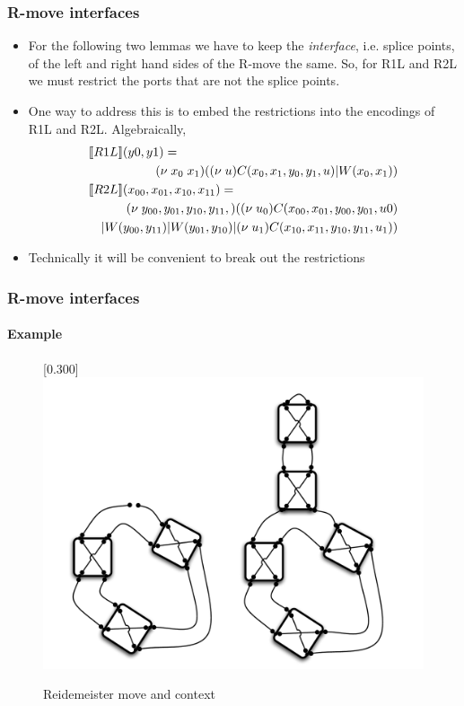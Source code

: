 \documentclass{beamer}
\begin{document}
\begin{frame}
  \frametitle{R-move interfaces}
  \begin{itemize}
  \item For the following two lemmas we have to keep the
    \textit{interface}, i.e. splice points, of the left and right hand
    sides of the R-move the same. So, for R1L and R2L we must restrict
    the ports that are not the splice points.
  \item One way to address this is to embed the restrictions into the
    encodings of R1L and R2L. Algebraically,
    \begin{eqnarray}
      \lefteqn{\meaningof{R1L}(y0,y1) =} \nonumber \\
      & & (\nu \; x_{0} \; x_{1}) ((\nu \; u)C(x_{0},x_{1},y_{0},y_{1},u) | W(x_{0},x_{1})) \nonumber \\
      \lefteqn{\meaningof{R2L}(x_{00},x_{01},x_{10},x_{11}) =} \nonumber \\
      & & (\nu \; y_{00},y_{01},y_{10},y_{11},)((\nu \; u_{0})C(x_{00},x_{01},y_{00},y_{01},u{0}) \nonumber \\
      & & | W(y_{00},y_{11}) | W(y_{01},y_{10}) | (\nu \; u_{1})C(x_{10},x_{11},y_{10},y_{11},u_1)) \nonumber
    \end{eqnarray}
    \item Technically it will be convenient to break out the restrictions
  \end{itemize}
\end{frame}

\begin{frame}
  \frametitle{R-move interfaces}
  \framesubtitle{Example}
  \begin{figure}[tbp]
    \centering
    \scalebox{0.30}[0.300]{\includegraphics[viewport=30 30 810 520]{TrefoilMethodIllustrationWithFingerMove221072006}}
    \caption{ Reidemeister move and context }
  \end{figure}
\end{frame}
\end{document}
